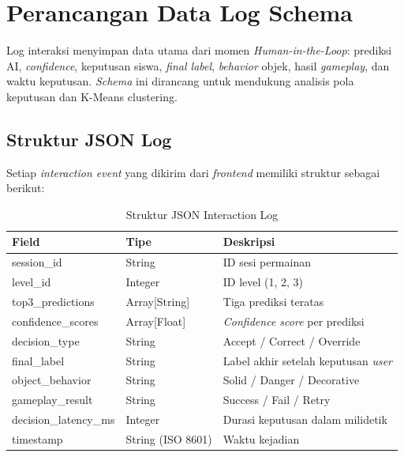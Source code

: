 \documentclass[10pt,twoside,openright]{report}
\begin{document}
\section{Perancangan Data Log Schema}
\label{sec:perancangan-data-log}

Log interaksi menyimpan data utama dari momen \textit{Human-in-the-Loop}: prediksi AI, \textit{confidence}, keputusan siswa, \textit{final label}, \textit{behavior} objek, hasil \textit{gameplay}, dan waktu keputusan. \textit{Schema} ini dirancang untuk mendukung analisis pola keputusan dan K-Means clustering.

\subsection{Struktur JSON Log}

Setiap \textit{interaction event} yang dikirim dari \textit{frontend} memiliki struktur sebagai berikut:

\begin{table}[ht]
\centering
\caption{Struktur JSON Interaction Log}
\label{tab:json-log}
\begin{tabular}{|l|l|l|}
\hline
\textbf{Field} & \textbf{Tipe} & \textbf{Deskripsi} \\ \hline
session\_id & String & ID sesi permainan \\ \hline
level\_id & Integer & ID level (1, 2, 3) \\ \hline
top3\_predictions & Array[String] & Tiga prediksi teratas \\ \hline
confidence\_scores & Array[Float] & \textit{Confidence score} per prediksi \\ \hline
decision\_type & String & Accept / Correct / Override \\ \hline
final\_label & String & Label akhir setelah keputusan \textit{user} \\ \hline
object\_behavior & String & Solid / Danger / Decorative \\ \hline
gameplay\_result & String & Success / Fail / Retry \\ \hline
decision\_latency\_ms & Integer & Durasi keputusan dalam milidetik \\ \hline
timestamp & String (ISO 8601) & Waktu kejadian \\ \hline
\end{tabular}
\end{table}
\end{document}
